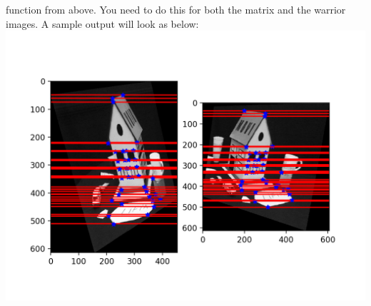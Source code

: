 \documentclass[11pt]{article}
\makeatletter
\def\maxwidth{\ifdim\Gin@nat@width>\linewidth\linewidth
    \else\Gin@nat@width\fi}
\let\Oldincludegraphics\includegraphics
\renewcommand{\includegraphics}[1]{\Oldincludegraphics[width=.8\maxwidth]{#1}}
\makeatother
\begin{document}
function from above. You need to do this for both the matrix and the
warrior images. A sample output will look as below:
\includegraphics{sample_rectification.png}
\end{document}
